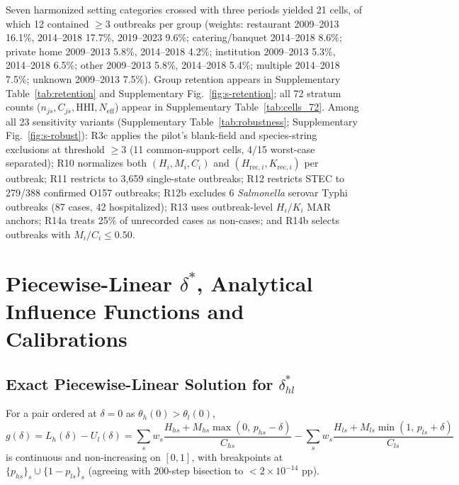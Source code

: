\documentclass[11pt,a4paper]{article}
\begin{document}
Seven harmonized setting categories crossed with three periods yielded 21 cells, of which 12 contained $\ge 3$ outbreaks per group (weights: restaurant 2009--2013 16.1\%, 2014--2018 17.7\%, 2019--2023 9.6\%; catering/banquet 2014--2018 8.6\%; private home 2009--2013 5.8\%, 2014--2018 4.2\%; institution 2009--2013 5.3\%, 2014--2018 6.5\%; other 2009--2013 5.8\%, 2014--2018 5.4\%; multiple 2014--2018 7.5\%; unknown 2009--2013 7.5\%). Group retention appears in Supplementary Table~\ref{tab:retention} and Supplementary Fig.~\ref{fig:s-retention}; all 72 stratum counts ($n_{js}, C_{js}, \text{HHI}, N_{\text{eff}}$) appear in Supplementary Table~\ref{tab:cells_72}. Among all 23 sensitivity variants (Supplementary Table~\ref{tab:robustness}; Supplementary Fig.~\ref{fig:s-robust}): R3c applies the pilot's blank-field and species-string exclusions at threshold $\ge 3$ (11 common-support cells, 4/15 worst-case separated); R10 normalizes both $(H_i, M_i, C_i)$ and $(H_{\text{rec},i}, K_{\text{rec},i})$ per outbreak; R11 restricts to 3,659 single-state outbreaks; R12 restricts STEC to 279/388 confirmed O157 outbreaks; R12b excludes 6 \textit{Salmonella} serovar Typhi outbreaks (87 cases, 42 hospitalized); R13 uses outbreak-level $H_i/K_i$ MAR anchors; R14a treats 25\% of unrecorded cases as non-cases; and R14b selects outbreaks with $M_i/C_i \le 0.50$.

\section{Piecewise-Linear \texorpdfstring{$\delta^{*}$}{delta*}, Analytical Influence Functions and Calibrations}\label{sec:s-methods}

\subsection*{Exact Piecewise-Linear Solution for $\delta^{*}_{hl}$}
For a pair ordered at $\delta = 0$ as $\theta_h(0) > \theta_l(0)$,
\begin{equation}
  g(\delta) = L_h(\delta) - U_l(\delta)
  = \sum_s w_s \frac{H_{hs} + M_{hs}\max(0,\, p_{hs} - \delta)}{C_{hs}}
  - \sum_s w_s \frac{H_{ls} + M_{ls}\min(1,\, p_{ls} + \delta)}{C_{ls}}
  \label{eq:s-gap}
\end{equation}
is continuous and non-increasing on $[0, 1]$, with breakpoints at $\{p_{hs}\}_s \cup \{1 - p_{ls}\}_s$ (agreeing with 200-step bisection to $< 2 \times 10^{-14}\text{ pp}$).
\end{document}
